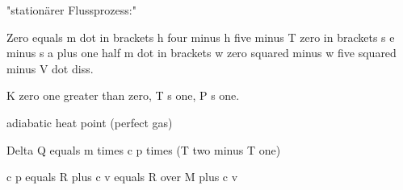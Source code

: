 "stationärer Flussprozess:"

Zero equals m dot in brackets h four minus h five minus T zero in brackets s e minus s a plus one half m dot in brackets w zero squared minus w five squared minus V dot diss.

K zero one greater than zero, T s one, P s one.

adiabatic heat point (perfect gas)

Delta Q equals m times c p times (T two minus T one) 

c p equals R plus c v equals R over M plus c v